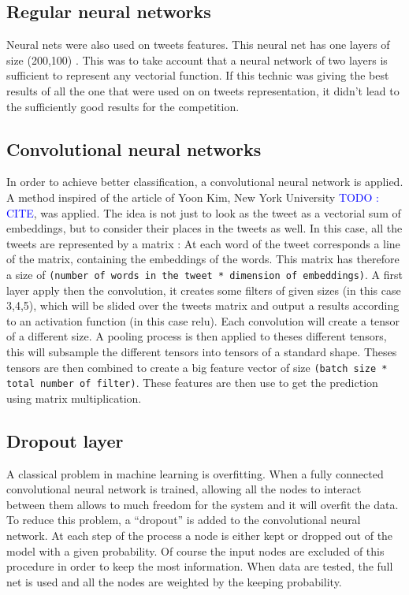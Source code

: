 \subsection{Regular neural networks}

Neural nets were also used on tweets features. This neural net has one layers of size (200,100) . This was to take account that a neural network of  two layers is sufficient to represent any vectorial function.  If this technic was giving the best results of all the one that were used on on tweets representation, it didn't lead to the sufficiently good results for the competition. 

\subsection{Convolutional neural networks}

In order to achieve better classification, a convolutional neural network is applied. A method inspired of the article of Yoon Kim, New York University \textcolor{blue}{TODO : CITE}, was applied. The idea is not just to look as the tweet as a vectorial sum of embeddings, but to consider their places in the tweets as well. In this case, all the tweets are represented by a matrix :  At each word of the tweet corresponds a line of the matrix, containing the embeddings of the words. This matrix has therefore a size of \texttt{(number of words in the tweet * dimension of embeddings)}. A first layer apply then the convolution, it creates some filters of given sizes (in this case  3,4,5), which will be slided over the tweets matrix and output a results according to an activation function (in this case relu). Each convolution will create a tensor of a different size. A pooling process is then applied to theses different tensors, this will subsample the different tensors into tensors of a standard shape. Theses tensors are then combined to create a big feature vector of size \texttt{(batch size * total number of filter)}. These features are then use to get the prediction using matrix multiplication. 

\subsection{Dropout layer}
A classical problem in machine learning is overfitting. When a fully connected convolutional neural network is trained, allowing all the nodes to interact between them allows to much freedom for the system and it will overfit the data. To reduce this problem, a ``dropout'' is added to the convolutional neural network. At each step of the process a node is either kept or dropped out of the model with a given probability.  Of course the input nodes are excluded of this procedure in order to keep the most information. When data are tested, the full net is used and all the nodes are weighted by the keeping probability. 

